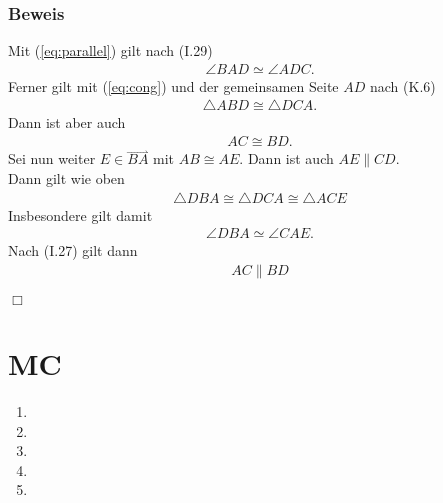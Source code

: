 \documentclass[11pt]{article}
\newcommand{\ray}[1]{\stackrel{\rightharpoonup}{#1}}
\begin{document}
\subsubsection*{Beweis}
Mit (\ref{eq:parallel}) gilt nach (I.29)
\begin{equation*}
\begin{aligned}
\angle BAD \simeq \angle ADC.
\end{aligned}
\end{equation*}
Ferner gilt mit (\ref{eq:cong}) und der gemeinsamen Seite $ AD $ nach (K.6)
\begin{equation*}
\begin{aligned}
\triangle ABD \cong \triangle DCA.
\end{aligned}
\end{equation*}
Dann ist aber auch
\begin{equation*}
\begin{aligned}
AC \cong BD.
\end{aligned}
\end{equation*}
Sei nun weiter $ E \in \ray{BA} $ mit $ AB \cong AE $. Dann ist auch $ AE \parallel CD $.\\
Dann gilt wie oben
\begin{equation*}
\begin{aligned}
\triangle DBA \cong \triangle DCA \cong \triangle ACE
\end{aligned}
\end{equation*}
Insbesondere gilt damit
\begin{equation*}
\begin{aligned}
\angle DBA \simeq \angle CAE.
\end{aligned}
\end{equation*}
Nach (I.27) gilt dann
\begin{equation*}
\begin{aligned}
AC \parallel BD
\end{aligned}
\end{equation*}
\begin{flushright}
	$ \Box $
\end{flushright}
\section*{MC}
\begin{enumerate}
	\item 
	\item 
	\item 
	\item 
	\item 
\end{enumerate}
\end{document}
